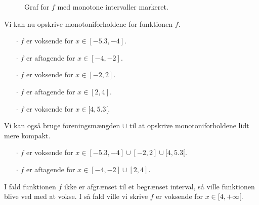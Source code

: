 \begin{exa}
\begin{figure}[H]
		\caption{Graf for $f$ med monotone intervaller markeret.}
		\label{fig:monotoni}
	\end{figure}
	Vi kan nu opskrive monotoniforholdene for funktionen $f$.
	\begin{itemize}
		\item[$\cdot$] $f$ er voksende for $x \in [-5.3,-4]$.
		\item[$\cdot$] $f$ er aftagende for $x \in [-4,-2]$.
		\item[$\cdot$] $f$ er voksende for $x \in [-2,2]$.
		\item[$\cdot$] $f$ er aftagende for $x \in [2,4]$.
		\item[$\cdot$] $f$ er voksende for $x \in [4,5.3[$.
	\end{itemize}
	Vi kan også bruge foreningsmængden $\cup$ til at opskrive monotoniforholdene lidt mere kompakt.
	\begin{itemize}
		\item[$\cdot$] $f$ er voksende for $x \in [-5.3,-4] \cup [-2,2] \cup [4,5.3[$.
		\item[$\cdot$] $f$ er aftagende for $x \in [-4,-2] \cup [2,4]$.
	\end{itemize}
	I fald funktionen $f$ ikke er afgrænset til et begrænset interval, så ville funktionen blive ved med at 
	vokse. I så fald ville vi skrive $f$ er voksende for $x \in [4,+\infty[$.
\end{exa}

\newpage

